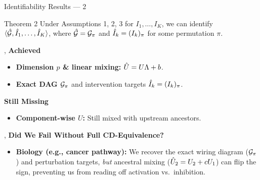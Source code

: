 \begin{frame}{Identifiability Results --- 2}
  \vspace{1ex}
  \begin{statement}{Theorem 2}
    Under Assumptions 1, 2, 3 for $I_1,\dots,I_K$, we can identify $\langle \hat{\mathcal{G}}, \hat{I}_1,\dots,\hat{I}_K\rangle$, where $\hat{\mathcal{G}} = \mathcal{G}_\pi$ and $\hat{I}_k = (I_k)_\pi$ for some permutation $\pi$.
  \end{statement}
  \sep
  \textbf{Achieved}
  \begin{itemize}
    \item \textbf{Dimension $p$ \& linear mixing:} $\hat{U} = U\Lambda + b$.
    \item \textbf{Exact DAG $\mathcal{G}_\pi$} and intervention targets $\hat{I}_k = (I_k)_\pi$.
  \end{itemize}
  \textbf{Still Missing}
  \begin{itemize}
    \item \textbf{Component-wise $U$:} Still mixed with upstream ancestors.
  \end{itemize}
  \sep
  \textbf{Did We Fail Without Full CD-Equivalence?}
  \begin{itemize}
    \item \textbf{Biology (e.g., cancer pathway):} We recover the exact wiring diagram ($\mathcal{G}_\pi$) and perturbation targets, \emph{but} ancestral mixing ($\hat{U}_2 = U_2 + cU_1$) can flip the sign, preventing us from reading off activation vs.\ inhibition.
  \end{itemize}
\end{frame}

